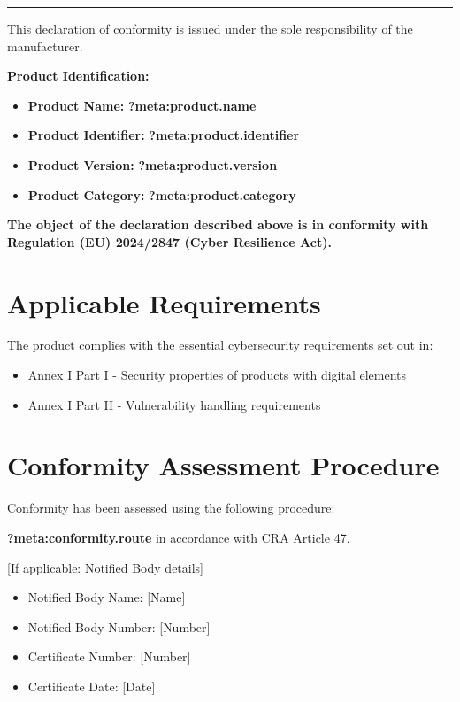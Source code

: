 \documentclass[
  11 pt,
  a4paper,
  table]{report}
\providecommand{\tightlist}{%
  \setlength{\itemsep}{0pt}\setlength{\parskip}{0pt}}\usepackage{longtable,booktabs,array}
\begin{document}
\begin{center}\rule{0.5\linewidth}{0.5pt}\end{center}

This declaration of conformity is issued under the sole responsibility
of the manufacturer.

\textbf{Product Identification:}

\begin{itemize}
\tightlist
\item
  \textbf{Product Name:} \textbf{?meta:product.name}
\item
  \textbf{Product Identifier:} \textbf{?meta:product.identifier}
\item
  \textbf{Product Version:} \textbf{?meta:product.version}
\item
  \textbf{Product Category:} \textbf{?meta:product.category}
\end{itemize}

\textbf{The object of the declaration described above is in conformity
with Regulation (EU) 2024/2847 (Cyber Resilience Act).}

\section{Applicable Requirements}\label{applicable-requirements}

The product complies with the essential cybersecurity requirements set
out in:

\begin{itemize}
\tightlist
\item
  Annex I Part I - Security properties of products with digital elements
\item
  Annex I Part II - Vulnerability handling requirements
\end{itemize}

\section{Conformity Assessment
Procedure}\label{conformity-assessment-procedure}

Conformity has been assessed using the following procedure:

\textbf{\textbf{?meta:conformity.route}} in accordance with CRA Article
47.

{[}If applicable: Notified Body details{]}

\begin{itemize}
\tightlist
\item
  Notified Body Name: {[}Name{]}
\item
  Notified Body Number: {[}Number{]}
\item
  Certificate Number: {[}Number{]}
\item
  Certificate Date: {[}Date{]}
\end{itemize}
\end{document}
